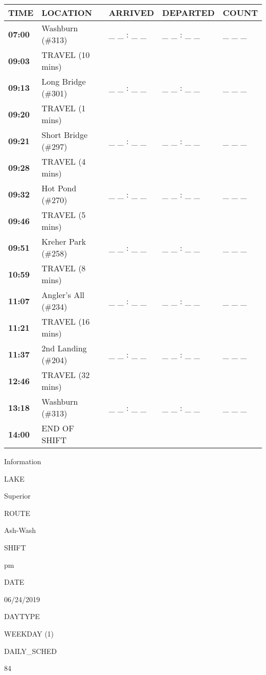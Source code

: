 \documentclass[]{article}
\begin{document}
\begin{tabular}{>{\bfseries}lllll}
\toprule
\textbf{TIME} & \textbf{LOCATION} & \textbf{ARRIVED} & \textbf{DEPARTED} & \textbf{COUNT}\\
\midrule
07:00 & Washburn (\#313) & \_ \_ : \_ \_ & \_ \_ : \_ \_ & \_ \_ \_\\
09:03 & TRAVEL (10 mins) &  &  & \\
09:13 & Long Bridge (\#301) & \_ \_ : \_ \_ & \_ \_ : \_ \_ & \_ \_ \_\\
09:20 & TRAVEL (1 mins) &  &  & \\
09:21 & Short Bridge (\#297) & \_ \_ : \_ \_ & \_ \_ : \_ \_ & \_ \_ \_\\
09:28 & TRAVEL (4 mins) &  &  & \\
09:32 & Hot Pond (\#270) & \_ \_ : \_ \_ & \_ \_ : \_ \_ & \_ \_ \_\\
09:46 & TRAVEL (5 mins) &  &  & \\
09:51 & Kreher Park (\#258) & \_ \_ : \_ \_ & \_ \_ : \_ \_ & \_ \_ \_\\
10:59 & TRAVEL (8 mins) &  &  & \\
11:07 & Angler's All (\#234) & \_ \_ : \_ \_ & \_ \_ : \_ \_ & \_ \_ \_\\
11:21 & TRAVEL (16 mins) &  &  & \\
11:37 & 2nd Landing (\#204) & \_ \_ : \_ \_ & \_ \_ : \_ \_ & \_ \_ \_\\
12:46 & TRAVEL (32 mins) &  &  & \\
13:18 & Washburn (\#313) & \_ \_ : \_ \_ & \_ \_ : \_ \_ & \_ \_ \_\\
14:00 & END OF SHIFT &  &  & \\
\bottomrule
\end{tabular}\newpage

Information

LAKE

Superior

ROUTE

Ash-Wash

SHIFT

pm

DATE

06/24/2019

DAYTYPE

WEEKDAY (1)

DAILY\_SCHED

84

\vspace{24pt}
\end{document}
